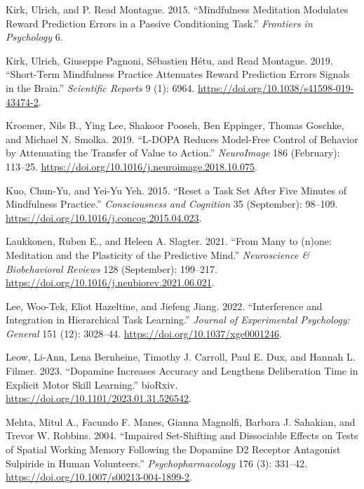 \documentclass{article}
\newlength{\cslhangindent}
\newlength{\cslentryspacingunit} %
\newenvironment{CSLReferences}[2] %
 {%
  \setlength{\parindent}{0pt}
  \ifodd #1
  \let\oldpar\par
  \def\par{\hangindent=\cslhangindent\oldpar}
  \fi
  \setlength{\parskip}{#2\cslentryspacingunit}
 }%
 {}
\begin{document}
\begin{CSLReferences}{1}{0}
\leavevmode{}%
Kirk, Ulrich, and P. Read Montague. 2015. {``Mindfulness Meditation
Modulates Reward Prediction Errors in a Passive Conditioning Task.''}
\emph{Frontiers in Psychology} 6.

\leavevmode{}%
Kirk, Ulrich, Giuseppe Pagnoni, Sébastien Hétu, and Read Montague. 2019.
{``Short-Term Mindfulness Practice Attenuates Reward Prediction Errors
Signals in the Brain.''} \emph{Scientific Reports} 9 (1): 6964.
\url{https://doi.org/10.1038/s41598-019-43474-2}.

\leavevmode{}%
Kroemer, Nils B., Ying Lee, Shakoor Pooseh, Ben Eppinger, Thomas
Goschke, and Michael N. Smolka. 2019. {``L-{DOPA} Reduces Model-Free
Control of Behavior by Attenuating the Transfer of Value to Action.''}
\emph{NeuroImage} 186 (February): 113--25.
\url{https://doi.org/10.1016/j.neuroimage.2018.10.075}.

\leavevmode{}%
Kuo, Chun-Yu, and Yei-Yu Yeh. 2015. {``Reset a Task Set After Five
Minutes of Mindfulness Practice.''} \emph{Consciousness and Cognition}
35 (September): 98--109.
\url{https://doi.org/10.1016/j.concog.2015.04.023}.

\leavevmode{}%
Laukkonen, Ruben E., and Heleen A. Slagter. 2021. {``From Many to
(n)one: {Meditation} and the Plasticity of the Predictive Mind.''}
\emph{Neuroscience \& Biobehavioral Reviews} 128 (September): 199--217.
\url{https://doi.org/10.1016/j.neubiorev.2021.06.021}.

\leavevmode{}%
Lee, Woo-Tek, Eliot Hazeltine, and Jiefeng Jiang. 2022. {``Interference
and Integration in Hierarchical Task Learning.''} \emph{Journal of
Experimental Psychology: General} 151 (12): 3028--44.
\url{https://doi.org/10.1037/xge0001246}.

\leavevmode{}%
Leow, Li-Ann, Lena Bernheine, Timothy J. Carroll, Paul E. Dux, and
Hannah L. Filmer. 2023. {``Dopamine Increases Accuracy and Lengthens
Deliberation Time in Explicit Motor Skill Learning.''} {bioRxiv}.
\url{https://doi.org/10.1101/2023.01.31.526542}.

\leavevmode{}%
Mehta, Mitul A., Facundo F. Manes, Gianna Magnolfi, Barbara J. Sahakian,
and Trevor W. Robbins. 2004. {``Impaired Set-Shifting and Dissociable
Effects on Tests of Spatial Working Memory Following the Dopamine {D2}
Receptor Antagonist Sulpiride in Human Volunteers.''}
\emph{Psychopharmacology} 176 (3): 331--42.
\url{https://doi.org/10.1007/s00213-004-1899-2}.


\end{CSLReferences}
\end{document}
